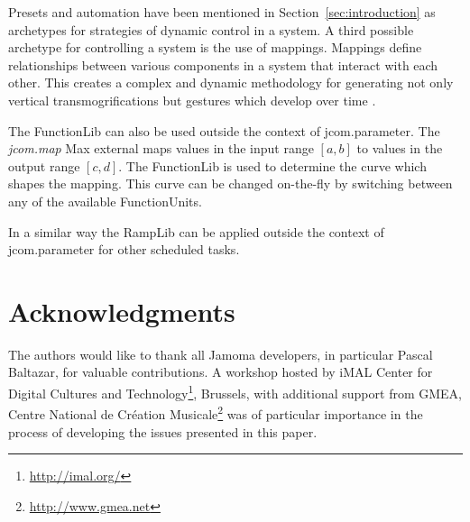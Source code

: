 \documentclass{article}
\begin{document}
Presets and automation have been mentioned in Section~\ref{sec:introduction} as archetypes for strategies of dynamic control in a system. A third possible archetype for controlling a system is the use of mappings. Mappings define relationships between various components in a system that interact with each other. This creates a complex and dynamic methodology for generating not only vertical transmogrifications but gestures which develop over time \cite{Hunt:2003,Nort:2006}.

The FunctionLib can also be used outside the context of jcom.parameter. The \emph{jcom.map} Max external maps values in the input range $[a,b]$ to values in the output range $[c,d]$. The FunctionLib is used to determine the curve which shapes the mapping. This curve can be changed on-the-fly by switching between any of the available FunctionUnits. %

In a similar way the RampLib can be applied outside the context of jcom.parameter for other scheduled tasks.


\section{Acknowledgments} %

The authors would like to thank all Jamoma developers, in particular Pascal Baltazar, for valuable contributions. A workshop hosted by iMAL Center for Digital Cultures and Technology\footnote{\url{http://imal.org/}}, Brussels, with additional support from GMEA, Centre National de Cr\'eation Musicale\footnote{\url{http://www.gmea.net}} was of particular importance in the process of developing the issues presented in this paper.


\end{document}
